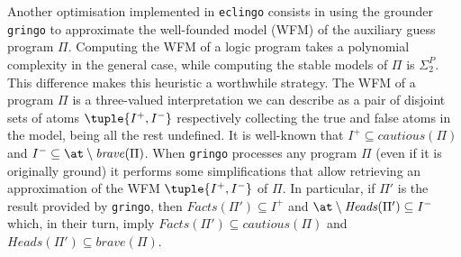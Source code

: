 \documentclass{new_tlp}
\def\eclingo{{\tt eclingo}}
\def\Facts{\mathit{Facts}}
\def\Heads{\mathit{Heads}}
\begin{document}
Another optimisation implemented in \eclingo{} consists in using the grounder {\tt gringo} to approximate the well-founded model (WFM) of the auxiliary guess program $\Pi$.
%
Computing the WFM of a logic program takes a polynomial complexity in the general case, while computing the stable models of $\Pi$ is $\Sigma^{P}_{2}$. This difference makes this heuristic a worthwhile strategy. 
%
The WFM of a program $\Pi$ is a three-valued interpretation we can describe as a pair of disjoint sets of atoms $\tuple{I^+,I^-}$ respectively collecting the true and false atoms in the model, being all the rest undefined.
%
It is well-known that $I^+ \subseteq \mathit{cautious}(\Pi)$ and $I^- \subseteq \at \setminus \mathit{brave}(\Pi)$.
%
When {\tt gringo} processes any program $\Pi$ (even if it is originally ground) it performs some simplifications that allow retrieving an approximation of the WFM $\tuple{I^+,I^-}$ of $\Pi$.
%
In particular, if $\Pi'$ is the result provided by {\tt gringo}, then $\Facts(\Pi') \subseteq I^+$ and $\at \setminus \Heads(\Pi') \subseteq I^-$ which, in their turn, imply $\Facts(\Pi') \subseteq \mathit{cautious}(\Pi)$ and $\Heads(\Pi') \subseteq \mathit{brave}(\Pi)$.
%
%
\end{document}
